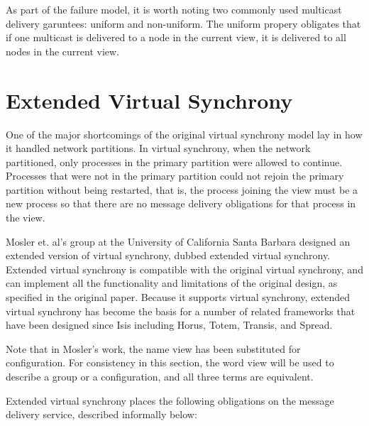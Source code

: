 As part of the failure model, it is worth noting two commonly used multicast
delivery garuntees: uniform and non-uniform. The uniform propery obligates that
if one multicast is delivered to a node in the current view, it is delivered to
all nodes in the current view.

\section{Extended Virtual Synchrony}

One of the major shortcomings of the original virtual synchrony model lay in
how it handled network partitions. In virtual synchrony, when the network
partitioned, only processes in the primary partition were allowed to continue.
Processes that were not in the primary partition could not rejoin the primary
partition without being restarted, that is, the process joining the view must
be a new process so that there are no message delivery obligations for that
process in the view.

Mosler et. al's group at the University of California Santa Barbara designed
an extended version of virtual synchrony, dubbed extended virtual synchrony.
Extended virtual synchrony is compatible with the original virtual synchrony,
and can implement all the functionality and limitations of the original design,
as specified in the original paper. Because it supports virtual synchrony,
extended virtual synchrony has become the basis for a number of related
frameworks that have been designed since Isis including Horus, Totem, Transis,
and Spread.

Note that in Mosler's work, the name view has been substituted for configuration.
For consistency in this section, the word view will be used to describe a group
or a configuration, and all three terms are equivalent.

Extended virtual synchrony places the following obligations on the message
delivery service, described informally below:

